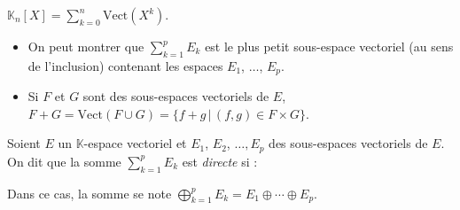 \documentclass[a4paper,10pt]{report}
\newcommand{\Sum}[2]{\ensuremath{\textstyle{\sum\limits_{#1}^{#2}}}}
\begin{document}
\begin{Demonstration}{}

\vspace{6cm}


\end{Demonstration}

\begin{Exemple} $\mathbb{K}_n[X] = \Sum{k=0}{n} \textrm{Vect}(X^k)$.
\end{Exemple}

\begin{Remarques}{}
\begin{itemize} 
\item On peut montrer que $\Sum{k=1}{p} E_k$ est le plus petit sous-espace vectoriel (au sens de l'inclusion) contenant les espaces $E_1$, $\ldots$, $E_p$. 
\item Si $F$ et $G$ sont des sous-espaces vectoriels de $E$, $F+G = \textrm{Vect}(F \cup G) = \lbrace f+g \, \vert \, (f,g) \in F \times G\rbrace$.
\end{itemize}
\end{Remarques}{}

\begin{Definition}{} 
Soient $E$ un $\mathbb{K}$-espace vectoriel et $E_1$, $E_2$, $\ldots, E_p$ des sous-espaces vectoriels de $E$. On dit que la somme $\Sum{k=1}{p} E_k$ est \emph{directe} si :

\vspace{1cm}
%
Dans ce cas, la somme se note $\bigoplus_{k=1}^p E_k = E_1 \oplus \cdots \oplus E_p$.
\end{Definition}
\end{document}
